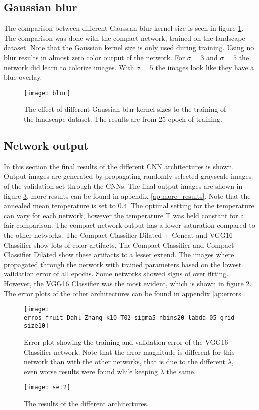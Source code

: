 \subsection{Gaussian blur}
The comparison between different Gaussian blur kernel size is seen in figure \ref{fig:blur}. The comparison was done with the compact network, trained on the landscape dataset. Note that the Gaussian kernel size is only used during training. Using no blur results in almost zero color output of the network. For $\sigma = 3$ and $\sigma = 5$ the network did learn to colorize images. With $\sigma = 5$ the images look like they have a blue overlay.

\begin{figure}[h]
	\centering
	\texttt{[image: blur]}
	\caption{The effect of different Gaussian blur kernel sizes to the training of the landscape dataset. The results are from 25 epoch of training.}
	\label{fig:blur}
\end{figure}

\subsection{Network output}
In this section the final results of the different CNN architectures is shown. Output images are generated by propagating randomly selected grayscale images of the validation set through the CNNs. The final output images are shown in figure \ref{fig:results}, more results can be found in appendix \ref{ap:more_results}. Note that the annealed mean temperature is set to $0.4$. The optimal setting for the temperature can vary for each network, however the temperature T was held constant for a fair comparison. The compact network output has a lower saturation compared to the other networks. The Compact Classifier Dilated + Concat and VGG16 Classifier show lots of color artifacts. The Compact Classifier and Compact Classifier Dilated show these artifacts to a lesser extend. The images where propagated through the network with trained parameters based on the lowest validation error of all epochs. Some networks showed signs of over fitting. However, the VGG16 Classifier was the most evident, which is shown in figure \ref{fig:overfit}. The error plots of the other architectures can be found in appendix \ref{ap:errors}.
\begin{figure}[h!]
	\centering
	\texttt{[image: erros\_fruit\_Dahl\_Zhang\_k10\_T02\_sigma5\_nbins20\_labda\_05\_gridsize10]}
	\caption{Error plot showing the training and validation error of the VGG16 Classifier network. Note that the error magnitude is different for this network than with the other networks, that is due to the different $\lambda$, even worse results were found while keeping $\lambda$ the same.}
	\label{fig:overfit}
\end{figure}

\clearpage
\begin{figure}[h!]
	\centering
	\texttt{[image: set2]}
	\caption{The results of the different architectures.}
	\label{fig:results}
\end{figure}



